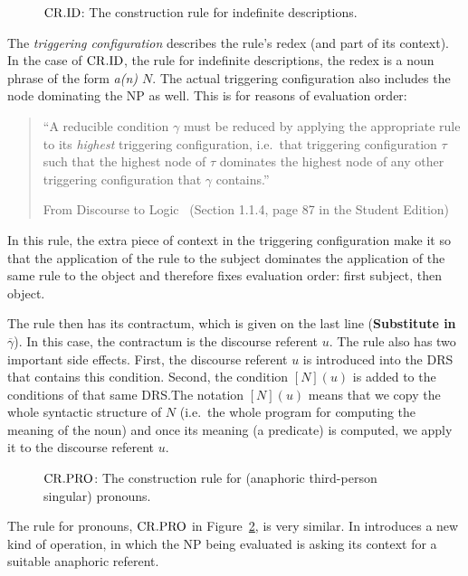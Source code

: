 \begin{figure}
\centering
\cridbox
\caption{\label{fig:crid} $\mathrm{CR.ID}$: The construction rule for indefinite
  descriptions.}
\end{figure}

The \emph{triggering configuration} describes the rule's redex (and part of
its context). In the case of $\mathrm{CR.ID}$, the rule for indefinite descriptions,
the redex is a noun phrase of the form \emph{a(n) $N$}. The actual
triggering configuration also includes the node dominating the NP as
well. This is for reasons of evaluation order:

\begin{quote}
``A reducible condition $\gamma$ must be reduced by applying the appropriate
rule to its \emph{highest} triggering configuration, i.e.\ that triggering
configuration $\tau$ such that the highest node of $\tau$ dominates the
highest node of any other triggering configuration that $\gamma$ contains.''
\begin{flushright}
  From Discourse to Logic~\cite{kamp1993discourse} (Section 1.1.4, page 87
  in the Student Edition)
\end{flushright}
\end{quote}

In this rule, the extra piece of context in the triggering configuration
make it so that the application of the rule to the subject dominates the
application of the same rule to the object and therefore fixes evaluation
order: first subject, then object.

The rule then has its contractum, which is given on the last line
(\textbf{Substitute in $\overline{\gamma}$}). In this case, the contractum
is the discourse referent $u$. The rule also has two important side
effects. First, the discourse referent $u$ is introduced into the DRS that
contains this condition. Second, the condition $[N](u)$ is added to the
conditions of that same DRS.\@ The notation $[N](u)$ means that we copy the
whole syntactic structure of $N$ (i.e.\ the whole program for computing the
meaning of the noun) and once its meaning (a predicate) is computed, we
apply it to the discourse referent $u$.

\begin{figure}
\centering
\crprobox
\caption{\label{fig:crpro} $\mathrm{CR.PRO}$: The construction rule for (anaphoric
  third-person singular) pronouns.}
\end{figure}

The rule for pronouns, $\mathrm{CR.PRO}$ in Figure~\ref{fig:crpro}, is very
similar. In introduces a new kind of operation, in which the NP being
evaluated is asking its context for a suitable anaphoric referent.

